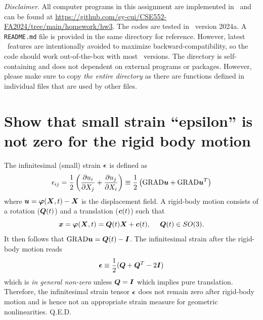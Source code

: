 \pagestyle{fancy}
\setlength{\headheight}{16pt}
\fancyhead{} %
\fancyfoot{} %
\fancyfoot[C]{\thepage}

\newcommand{\Fint}{\ensuremath{\bv{F}^{\textrm{int}}}}
\newcommand{\Fext}{\ensuremath{\bv{F}^{\textrm{ext}}}}

\noindent \emph{Disclaimer}. All computer programs in this assignment are implemented in \matlab~and can be found at \url{https://github.com/sy-cui/CSE552-FA2024/tree/main/homework/hw3}. 
The codes are tested in \matlab~version 2024a. 
A \texttt{README.md} file is provided in the same directory for reference. 
However, latest \matlab~features are intentionally avoided to maximize backward-compatibility, so the code should work out-of-the-box with most \matlab~versions. 
The directory is self-containing and does not dependent on external programs or packages. 
However, please make sure to copy \emph{the entire directory} as there are functions defined in individual files that are used by other files. 

\section{Show that small strain ``epsilon'' is not zero for the rigid body motion}
The infinitesimal (small) strain $\bm{\epsilon}$ is defined as 
\begin{equation}
    \epsilon_{ij} = \frac{1}{2}\left(\frac{\partial u_i}{\partial X_j} + \frac{\partial u_j}{\partial X_i}\right) \equiv \frac{1}{2}\left(\textrm{GRAD} \bm{u} + \textrm{GRAD} \bm{u}^T\right)
\end{equation}
where $\bm{u} = \bm{\varphi}(\bm{X}, t) - \bm{X}$ is the displacement field.
A rigid-body motion consists of a rotation ($\bm{Q}(t)$) and a translation ($\bm{c}(t)$) such that 
\begin{equation}\label{eqn:hw3_p1_rigid}
    \bm{x} = \bm{\varphi}(\bm{X}, t) = \bm{Q}(t) \bm{X} + \bm{c}(t), ~~~~ \bm{Q}(t)\in SO(3).
\end{equation}
It then follows that $\textrm{GRAD}\bm{u} = \bm{Q}(t) - \bm{I}$. 
The infinitesimal strain after the rigid-body motion reads
\begin{equation}
    \bm{\epsilon} \equiv \frac{1}{2}(\bm{Q} + \bm{Q}^T - 2\bm{I})
\end{equation}
which is \emph{in general non-zero} unless $\bm{Q} = \bm{I}$ which implies pure translation.
Therefore, the infinitesimal strain tensor $\bm{\epsilon}$ does not remain zero after rigid-body motion and is hence not an appropriate strain measure for geometric nonlinearities. Q.E.D.

